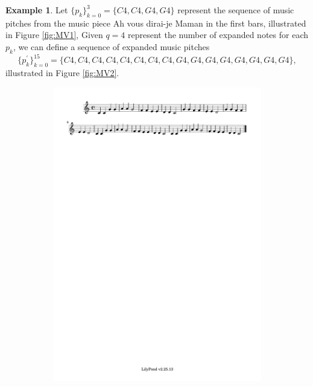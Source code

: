 \documentclass[11pt]{article}
\theoremstyle{definition}
\newtheorem{example}[theorem]{Example}
\begin{document}
\begin{example}
\label{ex: MV}
Let $ \{p_k\}_{k=0}^{3} = \{ C4, C4, G4, G4 \} $ represent the sequence of music pitches from the music piece Ah vous dirai-je Maman in the first bars, illustrated in Figure \ref{fig:MV1},
Given $q = 4$ represent the number of expanded notes for each $p_k$, we can define a sequence of expanded music pitches 
\[\{p^\prime_k\}_{k=0}^{15} = \{ C4, C4, C4, C4, C4, C4, C4, C4, G4, G4, G4, G4, G4, G4, G4, G4 \}, \] 
illustrated in Figure \ref{fig:MV2}.

\end{example}

\begin{figure}
\centering
\begin{subfigure}{\textwidth}
\centering
\includegraphics[trim=1cm 26.5cm 14.325cm 0.02cm, clip, scale=0.8]{dabby_1.pdf} %

\end{subfigure}
\end{figure}
\end{document}
